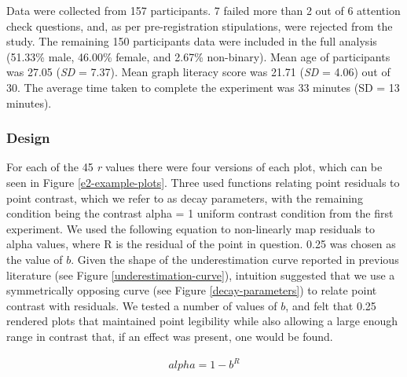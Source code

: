 \documentclass[preprint, 3p,
authoryear]{elsarticle} %
\begin{document}
Data were collected from 157 participants. 7 failed more than 2 out of 6
attention check questions, and, as per pre-registration stipulations,
were rejected from the study. The remaining 150 participants data were
included in the full analysis (51.33\% male, 46.00\% female, and 2.67\%
non-binary). Mean age of participants was 27.05 (\emph{SD} = 7.37). Mean
graph literacy score was 21.71 (\emph{SD} = 4.06) out of 30. The average
time taken to complete the experiment was 33 minutes (SD = 13 minutes).

\hypertarget{design-1}{%
\subsubsection{Design}\label{design-1}}

For each of the 45 \emph{r} values there were four versions of each
plot, which can be seen in Figure \ref{e2-example-plots}. Three used
functions relating point residuals to point contrast, which we refer to
as decay parameters, with the remaining condition being the contrast
alpha = 1 uniform contrast condition from the first experiment. We used
the following equation to non-linearly map residuals to alpha values,
where R is the residual of the point in question. 0.25 was chosen as the
value of \(b\). Given the shape of the underestimation curve reported in
previous literature (see Figure \ref{underestimation-curve}), intuition
suggested that we use a symmetrically opposing curve (see Figure
\ref{decay-parameters}) to relate point contrast with residuals. We
tested a number of values of \(b\), and felt that 0.25 rendered plots
that maintained point legibility while also allowing a large enough
range in contrast that, if an effect was present, one would be found.

\begin{align}
  alpha = 1 - b^R
\end{align}
\end{document}
